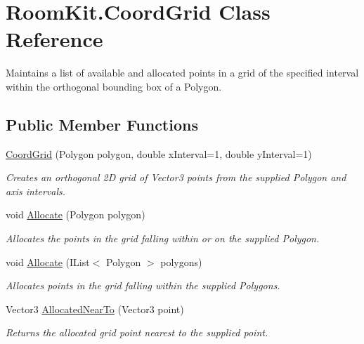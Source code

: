 \hypertarget{class_room_kit_1_1_coord_grid}{}\section{Room\+Kit.\+Coord\+Grid Class Reference}
\label{class_room_kit_1_1_coord_grid}


Maintains a list of available and allocated points in a grid of the specified interval within the orthogonal bounding box of a Polygon.  


\subsection*{Public Member Functions}
\begin{DoxyCompactItemize}
\item 
\mbox{\hyperlink{class_room_kit_1_1_coord_grid_a7c731b88924003f92e033c77f25b4036}{Coord\+Grid}} (Polygon polygon, double x\+Interval=1, double y\+Interval=1)
\begin{DoxyCompactList}\small\item\em Creates an orthogonal 2D grid of Vector3 points from the supplied Polygon and axis intervals. \end{DoxyCompactList}\item 
void \mbox{\hyperlink{class_room_kit_1_1_coord_grid_aa391c61e633bdbf883b9ba3ba9e29cff}{Allocate}} (Polygon polygon)
\begin{DoxyCompactList}\small\item\em Allocates the points in the grid falling within or on the supplied Polygon. \end{DoxyCompactList}\item 
void \mbox{\hyperlink{class_room_kit_1_1_coord_grid_a7f96fb5788564e43b2af28ecafd36765}{Allocate}} (I\+List$<$ Polygon $>$ polygons)
\begin{DoxyCompactList}\small\item\em Allocates points in the grid falling within the supplied Polygons. \end{DoxyCompactList}\item 
Vector3 \mbox{\hyperlink{class_room_kit_1_1_coord_grid_ab84486d4f82f59a37698784714c0deee}{Allocated\+Near\+To}} (Vector3 point)
\begin{DoxyCompactList}\small\item\em Returns the allocated grid point nearest to the supplied point. \end{DoxyCompactList}\item 

\end{DoxyCompactItemize}
